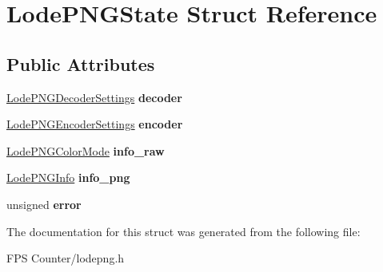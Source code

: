 \hypertarget{struct_lode_p_n_g_state}{}\section{Lode\+P\+N\+G\+State Struct Reference}
\label{struct_lode_p_n_g_state}
\subsection*{Public Attributes}
\begin{DoxyCompactItemize}
\item 
\mbox{\label{struct_lode_p_n_g_state_abd2c38ffc68f04b0e4159e1f97ba1f76}} 
\mbox{\hyperlink{struct_lode_p_n_g_decoder_settings}{Lode\+P\+N\+G\+Decoder\+Settings}} {\bfseries decoder}
\item 
\mbox{\label{struct_lode_p_n_g_state_ac63d91db835129d02eb83bbe81de347e}} 
\mbox{\hyperlink{struct_lode_p_n_g_encoder_settings}{Lode\+P\+N\+G\+Encoder\+Settings}} {\bfseries encoder}
\item 
\mbox{\label{struct_lode_p_n_g_state_a597bc08de787147474d43adf8b6ceacf}} 
\mbox{\hyperlink{struct_lode_p_n_g_color_mode}{Lode\+P\+N\+G\+Color\+Mode}} {\bfseries info\+\_\+raw}
\item 
\mbox{\label{struct_lode_p_n_g_state_a08d9ac43c995fcf34d72b1d37047b6fa}} 
\mbox{\hyperlink{struct_lode_p_n_g_info}{Lode\+P\+N\+G\+Info}} {\bfseries info\+\_\+png}
\item 
\mbox{\label{struct_lode_p_n_g_state_a1a00a050da588cf3c2b7a6252bebb0cd}} 
unsigned {\bfseries error}
\end{DoxyCompactItemize}


The documentation for this struct was generated from the following file\+:\begin{DoxyCompactItemize}
\item 
F\+P\+S Counter/lodepng.\+h\end{DoxyCompactItemize}
